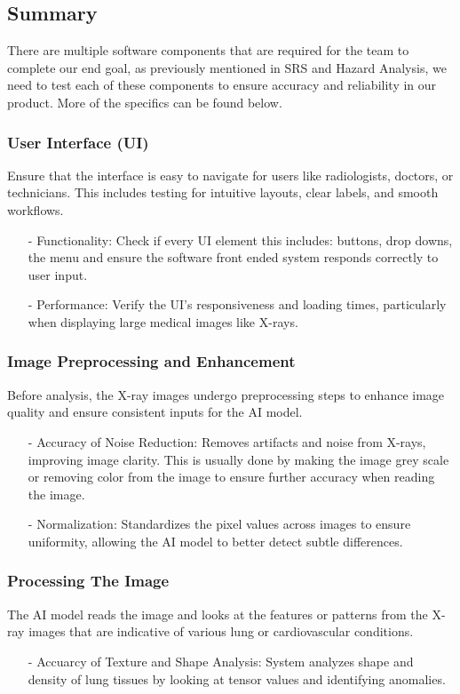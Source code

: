 \documentclass[12pt, titlepage]{article}
\begin{document}
\subsection{Summary}
There are multiple software components that are required for the team to complete our end goal, as previously mentioned in SRS and Hazard Analysis, we need to test each of these components to ensure accuracy and reliability in our product. More of the specifics can be found below.  
\subsubsection{User Interface (UI)}
Ensure that the interface is easy to navigate for users like radiologists, doctors, or technicians. This includes testing for intuitive layouts, clear labels, and smooth workflows.
\begin{itemize}
    \item[-] Functionality: Check if every UI element this includes: buttons, drop downs, the menu and ensure the software front ended system responds correctly to user input.
    \item[-] Performance: Verify the UI’s responsiveness and loading times, particularly when displaying large medical images like X-rays.
\end{itemize}

\subsubsection{Image Preprocessing and Enhancement}
Before analysis, the X-ray images undergo preprocessing steps to enhance image quality and ensure consistent inputs for the AI model.
\begin{itemize}
    \item[-] Accuracy of Noise Reduction: Removes artifacts and noise from X-rays, improving image clarity. This is usually done by making the image grey scale or removing color from the image to ensure further accuracy when reading the image. 
    \item[-] Normalization: Standardizes the pixel values across images to ensure uniformity, allowing the AI model to better detect subtle differences.
\end{itemize}

\subsubsection{Processing The Image}
The AI model reads the image and looks at the features or patterns from the X-ray images that are indicative of various lung or cardiovascular conditions.
\begin{itemize}
    \item[-] Accuarcy of Texture and Shape Analysis: System analyzes shape and density of lung tissues by looking at tensor values and identifying anomalies.
\end{itemize}
\end{document}
